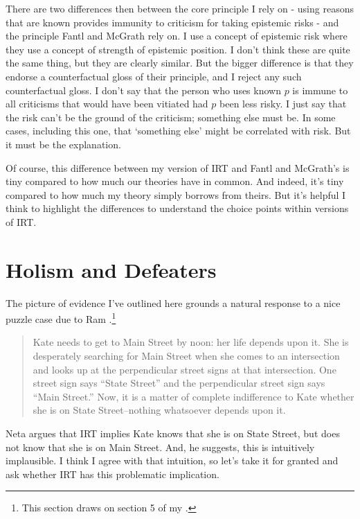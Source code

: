 \documentclass[11pt,]{book}
\let\rmarkdownfootnote\footnote%
\def\footnote{\protect\rmarkdownfootnote}
\begin{document}
There are two differences then between the core principle I rely on - using reasons that are known provides immunity to criticism for taking epistemic risks - and the principle Fantl and McGrath rely on. I use a concept of epistemic risk where they use a concept of strength of epistemic position. I don't think these are quite the same thing, but they are clearly similar. But the bigger difference is that they endorse a counterfactual gloss of their principle, and I reject any such counterfactual gloss. I don't say that the person who uses known \(p\) is immune to all criticisms that would have been vitiated had \(p\) been less risky. I just say that the risk can't be the ground of the criticism; something else must be. In some cases, including this one, that `something else' might be correlated with risk. But it must be the explanation.

Of course, this difference between my version of IRT and Fantl and McGrath's is tiny compared to how much our theories have in common. And indeed, it's tiny compared to how much my theory simply borrows from theirs. But it's helpful I think to highlight the differences to understand the choice points within versions of IRT.

\hypertarget{neta}{%
\section{Holism and Defeaters}\label{neta}}

The picture of evidence I've outlined here grounds a natural response to a nice puzzle case due to Ram \citet{Neta2007}.\footnote{This section draws on section 5 of my \citeyearpar{Weatherson2011-WEADIR}.}

\begin{quote}
Kate needs to get to Main Street by noon: her life depends upon it. She is desperately searching for Main Street when she comes to an intersection and looks up at the perpendicular street signs at that intersection. One street sign says ``State Street'' and the perpendicular street sign says ``Main Street.'' Now, it is a matter of complete indifference to Kate whether she is on State Street--nothing whatsoever depends upon it. \citep[182]{Neta2007}
\end{quote}

Neta argues that IRT implies Kate knows that she is on State Street, but does not know that she is on Main Street. And, he suggests, this is intuitively implausible. I think I agree with that intuition, so let's take it for granted and ask whether IRT has this problematic implication.
\end{document}
